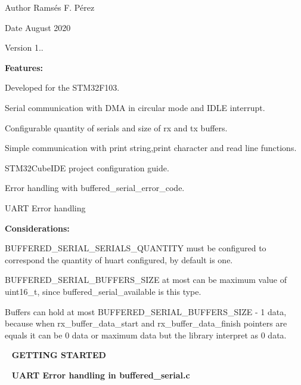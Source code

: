 \begin{DoxyAuthor}{Author}
Ramsés F. Pérez 
\end{DoxyAuthor}
\begin{DoxyDate}{Date}
August 2020 
\end{DoxyDate}
\begin{DoxyVersion}{Version}
1..
\end{DoxyVersion}
{\bfseries{Features\+:}}


\begin{DoxyItemize}
\item Developed for the S\+T\+M32\+F103.
\item Serial communication with D\+MA in circular mode and I\+D\+LE interrupt.
\item Configurable quantity of serials and size of rx and tx buffers.
\item Simple communication with print string,print character and read line functions.
\item S\+T\+M32\+Cube\+I\+DE project configuration guide.
\item Error handling with buffered\+\_\+serial\+\_\+error\+\_\+code.
\item U\+A\+RT Error handling
\end{DoxyItemize}

{\bfseries{Considerations\+:}}


\begin{DoxyItemize}
\item B\+U\+F\+F\+E\+R\+E\+D\+\_\+\+S\+E\+R\+I\+A\+L\+\_\+\+S\+E\+R\+I\+A\+L\+S\+\_\+\+Q\+U\+A\+N\+T\+I\+TY must be configured to correspond the quantity of huart configured, by default is one.
\item B\+U\+F\+F\+E\+R\+E\+D\+\_\+\+S\+E\+R\+I\+A\+L\+\_\+\+B\+U\+F\+F\+E\+R\+S\+\_\+\+S\+I\+ZE at most can be maximum value of uint16\+\_\+t, since buffered\+\_\+serial\+\_\+available is this type.
\item Buffers can hold at most B\+U\+F\+F\+E\+R\+E\+D\+\_\+\+S\+E\+R\+I\+A\+L\+\_\+\+B\+U\+F\+F\+E\+R\+S\+\_\+\+S\+I\+ZE -\/ 1 data, because when rx\+\_\+buffer\+\_\+data\+\_\+start and rx\+\_\+buffer\+\_\+data\+\_\+finish pointers are equals it can be 0 data or maximum data but the library interpret as 0 data.
\end{DoxyItemize}

~\newline
{\bfseries{G\+E\+T\+T\+I\+NG S\+T\+A\+R\+T\+ED}}

~\newline
{\bfseries{U\+A\+RT Error handling in buffered\+\_\+serial.\+c}} ~\newline
 
